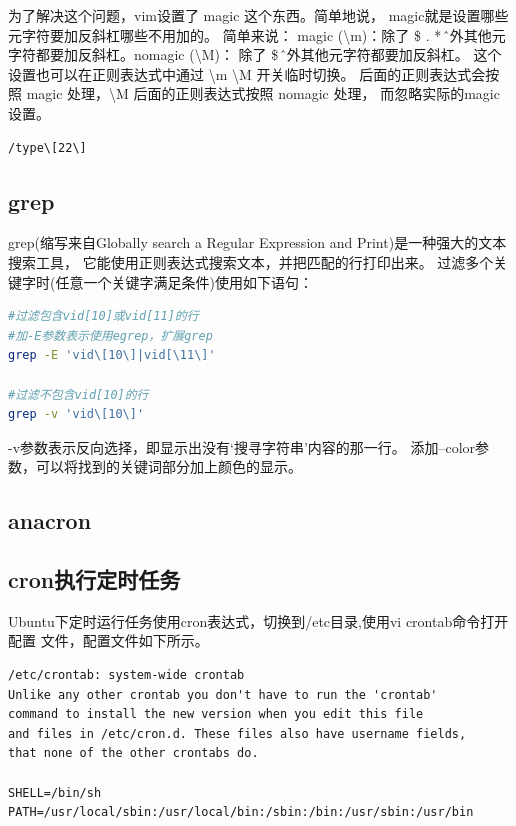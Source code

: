 \documentclass{book}
\begin{document}
为了解决这个问题，vim设置了 magic 这个东西。简单地说， magic就是设置哪些元字符要加反斜杠哪些不用加的。 
简单来说：
magic (\textbackslash m)：除了 \$ . * \^ 之外其他元字符都要加反斜杠。nomagic (\textbackslash M)：
除了 \$ \^ 之外其他元字符都要加反斜杠。
这个设置也可以在正则表达式中通过 \textbackslash m \textbackslash M 开关临时切换。 
\m 后面的正则表达式会按照 magic 处理，\textbackslash M 后面的正则表达式按照 nomagic 处理， 而忽略实际的magic设置。

\begin{lstlisting}[language=Bash]
/type\[22\]
\end{lstlisting}

\subsection{grep}

grep(缩写来自Globally search a Regular Expression and Print)是一种强大的文本搜索工具，
它能使用正则表达式搜索文本，并把匹配的行打印出来。
过滤多个关键字时(任意一个关键字满足条件)使用如下语句：

\begin{lstlisting}[language=Bash]
#过滤包含vid[10]或vid[11]的行
#加-E参数表示使用egrep，扩展grep
grep -E 'vid\[10\]|vid[\11\]'

#过滤不包含vid[10]的行
grep -v 'vid\[10\]'
\end{lstlisting}

-v参数表示反向选择，即显示出没有‘搜寻字符串’内容的那一行。
添加--color参数，可以将找到的关键词部分加上颜色的显示。

\subsection{anacron}

\subsection{cron执行定时任务}

Ubuntu下定时运行任务使用cron表达式，切换到/etc目录,使用vi crontab命令打开配置
文件，配置文件如下所示。

\begin{lstlisting}
/etc/crontab: system-wide crontab
Unlike any other crontab you don't have to run the 'crontab'
command to install the new version when you edit this file
and files in /etc/cron.d. These files also have username fields,
that none of the other crontabs do.

SHELL=/bin/sh
PATH=/usr/local/sbin:/usr/local/bin:/sbin:/bin:/usr/sbin:/usr/bin
\end{lstlisting}
\end{document}
